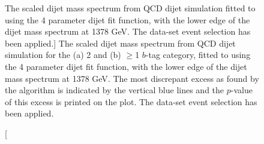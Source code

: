 \begin{figure}[!ht]
  \begin{center}
    \captionsetup[subfigure]{aboveskip=0pt,justification=centering}
  \end{center}
  \vspace{-1em}
  \caption
      [The scaled dijet mass spectrum from QCD dijet simulation
        fitted to using the 4 parameter dijet fit function, with the lower edge of the dijet mass spectrum at 1378 GeV.
        The \summer{} data-set event selection has been applied.]
      { The scaled dijet mass spectrum from QCD dijet simulation for the (a) 2 and (b) $\geq$1 $b$-tag  category,
       fitted to using the 4 parameter dijet fit function, with the lower edge of the dijet mass spectrum at 1378 GeV.
       The most discrepant excess as found by the \bh{} algorithm is indicated by the vertical blue lines and the \mbox{$p$-value} of this excess is printed on the plot.
       The \summer{} data-set event selection has been applied.}
  \label{fig:Short_4para_1378_figure1}
\end{figure}

